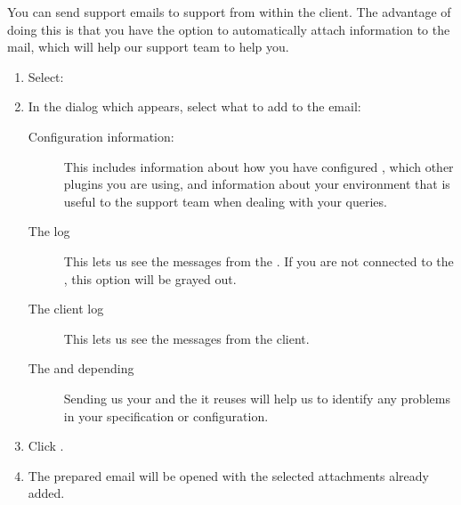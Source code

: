 

You can send support emails to \app{} support from within the \app{} client. The advantage of doing this is that you have the option to automatically attach information to the mail, which will help our support team to help you. 

\begin{enumerate}
\item Select:\\
\item In the dialog which appears, select what to add to the email: 
\begin{description}
\item [Configuration information:]{This includes information about how you have configured \app{}, which other plugins you are using, and information about your environment that is useful to the \app{} support team when dealing with your queries. }
\item [The \gdagent{} log]{This lets us see the messages from the \gdagent{}. If you are not connected to the \gdagent{}, this option will be grayed out. }
\item [The client log]{This lets us see the messages from the client. }
\item [The \gdproject{} and depending \gdprojects{}]{Sending us your \gdproject{} and the \gdprojects{} it reuses will help us to identify any problems in your specification or \gdaut{} configuration. }
\end{description}
\item Click . 
\item The prepared email will be opened with the selected attachments already added. 

\end{enumerate}
